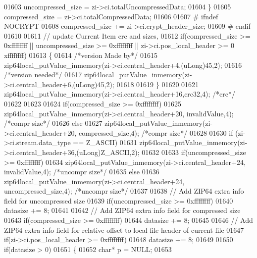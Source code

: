 \begin{DoxyCode}
01603         uncompressed\_size = zi->ci.totalUncompressedData;
01604     \}
01605     compressed\_size = zi->ci.totalCompressedData;
01606 
01607 \textcolor{preprocessor}{#    ifndef NOCRYPT}
01608     compressed\_size += zi->ci.crypt\_header\_size;
01609 \textcolor{preprocessor}{#    endif}
01610 
01611     \textcolor{comment}{// update Current Item crc and sizes,}
01612     \textcolor{keywordflow}{if}(compressed\_size >= 0xffffffff || uncompressed\_size >= 0xffffffff || zi->ci.pos\_local\_header >= 0
      xffffffff)
01613     \{
01614       \textcolor{comment}{/*version Made by*/}
01615       zip64local\_putValue\_inmemory(zi->ci.central\_header+4,(uLong)45,2);
01616       \textcolor{comment}{/*version needed*/}
01617       zip64local\_putValue\_inmemory(zi->ci.central\_header+6,(uLong)45,2);
01618 
01619     \}
01620 
01621     zip64local\_putValue\_inmemory(zi->ci.central\_header+16,crc32,4); \textcolor{comment}{/*crc*/}
01622 
01623 
01624     \textcolor{keywordflow}{if}(compressed\_size >= 0xffffffff)
01625       zip64local\_putValue\_inmemory(zi->ci.central\_header+20, invalidValue,4); \textcolor{comment}{/*compr size*/}
01626     \textcolor{keywordflow}{else}
01627       zip64local\_putValue\_inmemory(zi->ci.central\_header+20, compressed\_size,4); \textcolor{comment}{/*compr size*/}
01628 
01630     \textcolor{keywordflow}{if} (zi->ci.stream.data\_type == Z\_ASCII)
01631         zip64local\_putValue\_inmemory(zi->ci.central\_header+36,(uLong)Z\_ASCII,2);
01632 
01633     \textcolor{keywordflow}{if}(uncompressed\_size >= 0xffffffff)
01634       zip64local\_putValue\_inmemory(zi->ci.central\_header+24, invalidValue,4); \textcolor{comment}{/*uncompr size*/}
01635     \textcolor{keywordflow}{else}
01636       zip64local\_putValue\_inmemory(zi->ci.central\_header+24, uncompressed\_size,4); \textcolor{comment}{/*uncompr size*/}
01637 
01638     \textcolor{comment}{// Add ZIP64 extra info field for uncompressed size}
01639     \textcolor{keywordflow}{if}(uncompressed\_size >= 0xffffffff)
01640       datasize += 8;
01641 
01642     \textcolor{comment}{// Add ZIP64 extra info field for compressed size}
01643     \textcolor{keywordflow}{if}(compressed\_size >= 0xffffffff)
01644       datasize += 8;
01645 
01646     \textcolor{comment}{// Add ZIP64 extra info field for relative offset to local file header of current file}
01647     \textcolor{keywordflow}{if}(zi->ci.pos\_local\_header >= 0xffffffff)
01648       datasize += 8;
01649 
01650     \textcolor{keywordflow}{if}(datasize > 0)
01651     \{
01652       \textcolor{keywordtype}{char}* p = NULL;
01653 

\end{DoxyCode}
